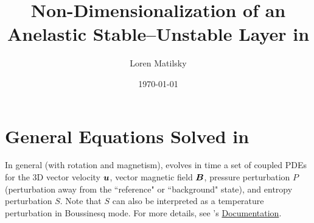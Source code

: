\documentclass[12pt]{article}
\date{\today}
\author{Loren Matilsky}
\title{Non-Dimensionalization of an Anelastic Stable--Unstable Layer in {\rayleigh}}
\numberwithin{equation}{section}
\begin{document}
	\maketitle
	\section{General Equations Solved in {\rayleigh}}
	In general (with rotation and magnetism), {\rayleigh} evolves in time a set of coupled PDEs for the 3D vector velocity $\bm{u}$, vector magnetic field $\bm{B}$, pressure perturbation $P$ (perturbation away from the ``reference" or ``background" state), and entropy perturbation $S$. Note that $S$ can also be interpreted as a temperature perturbation in Boussinesq mode. For more details, see {\rayleigh}'s \href{https://rayleigh-documentation.readthedocs.io/en/latest/doc/source/User_Guide/physics_math_overview.html#the-system-of-equations-solved-in-rayleigh}{Documentation}. 
	
\end{document}
